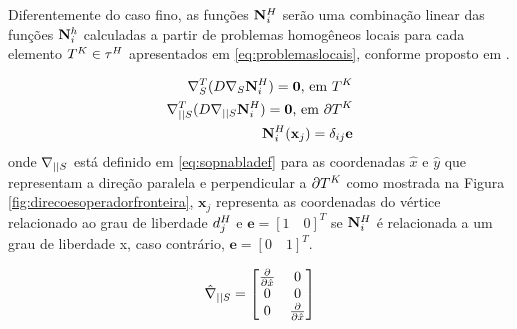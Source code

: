 Diferentemente do caso fino, as funções $\basefunctioncoarse$ serão uma combinação linear das funções $\basefunctionfine$ calculadas a partir de problemas homogêneos locais  para cada elemento $\coarseelement \in \coarseelementset$  apresentados em \eqref{eq:problemaslocais}, conforme proposto em \cite{casteletto}.


\begin{subequations} \label{eq:problemaslocais}
\begin{align}
\sopnabla ^T (D \sopnabla \basefunctioncoarse)  = \mathbf{0} \text{,   em   } \coarseelement \label{eq:operadorlocal}\\
\sopnablafront ^ T ( D  \sopnablafront \basefunctioncoarse) = \mathbf{0}  \text{,   em   } \partial \coarseelement  \label{eq:operadoraresta}\\
\basefunctioncoarse(\mathbf{x}_j) = \delta_{ij} \mathbf{e}
\label{eq:valorvertice}
\end{align}
\end{subequations}
onde $\sopnablafront$ está definido em \eqref{eq:sopnabladef} para as coordenadas $\hat{x}$ e $\hat{y}$ que representam a direção paralela e perpendicular a $\partial \coarseelement$ como mostrada na Figura \ref{fig:direcoesoperadorfronteira}, $\mathbf{x}_j$ representa as coordenadas do vértice relacionado ao grau de liberdade $\freedomcoarse[j]$ e  $\mathbf{e} = [1\quad0]^T $ se $\basefunctioncoarse$ é relacionada a um grau de liberdade x, caso contrário,  $\mathbf{e}=[0\quad1]^T$.

\begin{equation}\label{eq:sopnabladef}
\sopnablafronthat = \begin{bmatrix}
\dxhat  & 0 \\ 
0 & 0 \\ 
0 & \dxhat 
\end{bmatrix}
\end{equation}

 


